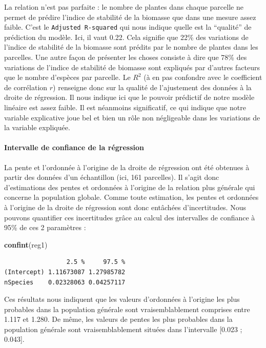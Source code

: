 \documentclass[
  a4paper,
]{article}
\newenvironment{Shaded}{\begin{snugshade}}{\end{snugshade}}
\newcommand{\KeywordTok}[1]{\textcolor[rgb]{0.12,0.11,0.11}{\textbf{#1}}}
\newcommand{\NormalTok}[1]{\textcolor[rgb]{0.12,0.11,0.11}{#1}}
\begin{document}
La relation n'est pas parfaite : le nombre de plantes dans chaque parcelle ne permet de prédire l'indice de stabilité de la biomasse que dans une mesure assez faible. C'est le \texttt{Adjusted\ R-squared} qui nous indique quelle est la ``qualité'' de prédiction du modèle. Ici, il vaut 0.22. Cela signifie que 22\% des variations de l'indice de stabilité de la biomasse sont prédits par le nombre de plantes dans les parcelles. Une autre façon de présenter les choses consiste à dire que 78\% des variations de l'indice de stabilité de biomasse sont expliqués par d'autres facteurs que le nombre d'espèces par parcelle. Le \(R^2\) (à en pas confondre avec le coefficient de corrélation \(r\)) renseigne donc sur la qualité de l'ajustement des données à la droite de régression. Il nous indique ici que le pouvoir prédictif de notre modèle linéaire est assez faible. Il est néanmoins significatif, ce qui indique que notre variable explicative joue bel et bien un rôle non négligeable dans les variations de la variable expliquée.

\hypertarget{intervalle-de-confiance-de-la-ruxe9gression}{%
\paragraph{Intervalle de confiance de la régression}\label{intervalle-de-confiance-de-la-ruxe9gression}}

La pente et l'ordonnée à l'origine de la droite de régression ont été obtenues à partir des données d'un échantillon (ici, 161 parcelles). Il s'agit donc d'estimations des pentes et ordonnées à l'origine de la relation plus générale qui concerne la population globale. Comme toute estimation, les pentes et ordonnées à l'origine de la droite de régression sont donc entâchées d'incertitudes. Nous pouvons quantifier ces incertitudes grâce au calcul des intervalles de confiance à 95\% de ces 2 paramètres :

\begin{Shaded}
\begin{Highlighting}[]
\KeywordTok{confint}\NormalTok{(reg1)}
\end{Highlighting}
\end{Shaded}

\begin{verbatim}
                 2.5 %     97.5 %
(Intercept) 1.11673087 1.27985782
nSpecies    0.02328063 0.04257117
\end{verbatim}

Ces résultats nous indiquent que les valeurs d'ordonnées à l'origine les plus probables dans la population générale sont vraisemblablement comprises entre 1.117 et 1.280. De même, les valeurs de pentes les plus probables dans la population générale sont vraisemblablement situées dans l'intervalle {[}0.023 ; 0.043{]}.
\end{document}
